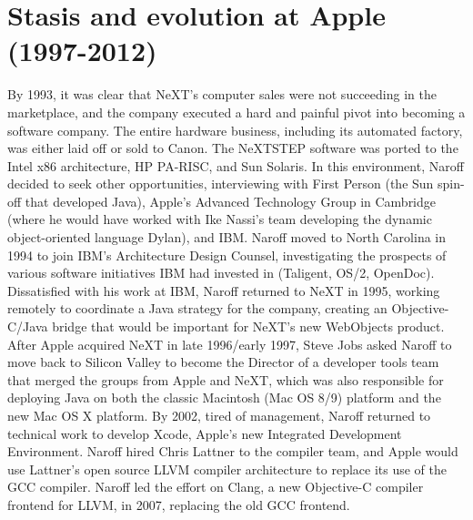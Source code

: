 \documentclass[acmsmall,screen]{acmart}
\begin{document}
\section{Stasis and evolution at Apple (1997-2012)}
\label{sec-apple1997-2012}
By 1993, it was clear that NeXT's computer sales were not succeeding in the marketplace, and the company executed a hard and painful pivot into becoming a software company. The entire hardware business, including its automated factory, was either laid off or sold to Canon. The NeXTSTEP software was ported to the Intel x86 architecture, HP PA-RISC, and Sun Solaris. In this environment, Naroff decided to seek other opportunities, interviewing with First Person (the Sun spin-off that developed Java), Apple's Advanced Technology Group in Cambridge (where he would have worked with Ike Nassi's team developing the dynamic object-oriented language Dylan), and IBM. Naroff moved to North Carolina in 1994 to join IBM's Architecture Design Counsel, investigating the prospects of various software initiatives IBM had invested in (Taligent, OS/2, OpenDoc). Dissatisfied with his work at IBM, Naroff returned to NeXT in 1995, working remotely to coordinate a Java strategy for the company, creating an Objective-C/Java bridge that would be important for NeXT's new WebObjects product. After Apple acquired NeXT in late 1996/early 1997, Steve Jobs asked Naroff to move back to Silicon Valley to become the Director of a developer tools team that merged the groups from Apple and NeXT, which was also responsible for deploying Java on both the classic Macintosh (Mac OS 8/9) platform and the new Mac OS X platform. By 2002, tired of management, Naroff returned to technical work to develop Xcode, Apple's new Integrated Development Environment. Naroff hired Chris Lattner to the compiler team, and Apple would use Lattner's open source LLVM compiler architecture to replace its use of the GCC compiler. Naroff led the effort on Clang, a new Objective-C compiler frontend for LLVM, in 2007, replacing the old GCC frontend.
\end{document}
